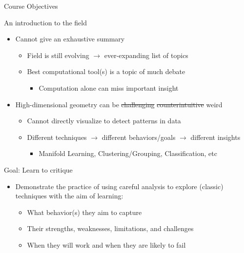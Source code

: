 \documentclass{beamer}
\begin{document}
\begin{frame}{Course Objectives}
\begin{block}{An introduction to the field}
\begin{itemize}
\item Cannot give an exhaustive summary
\begin{itemize}
\item Field is still evolving $\rightarrow$ ever-expanding list of topics
\item Best computational tool(s) is a topic of much debate
	\begin{itemize}
	\item Computation alone can miss important insight
	\end{itemize}
\end{itemize}
\item High-dimensional geometry can be \sout{challenging} \sout{counterintuitive} weird
\begin{itemize}
\item Cannot directly visualize to detect patterns in data
\item Different techniques $\rightarrow$ different behaviors/goals $\rightarrow$ different insights
	\begin{itemize}
	 \item Manifold Learning, Clustering/Grouping, Classification, etc \pause
	\end{itemize}
\end{itemize}
\end{itemize}
\end{block}
\begin{block}{Goal: Learn to critique}
\begin{itemize}
\item Demonstrate the practice of using careful analysis to explore (classic) techniques with the aim of learning:
\begin{itemize}
\item What behavior(s) they aim to capture
\item Their strengths, weaknesses, limitations, and challenges 
\item When they will work and when they are likely to fail
\end{itemize}
\end{itemize}
\end{block}
\end{frame}
\end{document}
